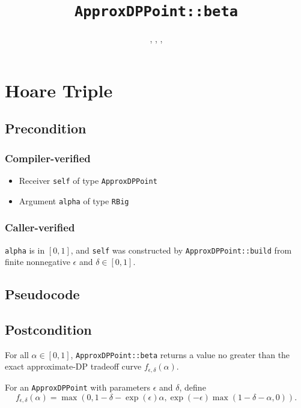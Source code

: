 \documentclass{article}
\title{\texttt{ApproxDPPoint::beta}}
\author{\AishwaryaRamasethuAuthor, \YuJuKuAuthor, \JordanAwanAuthor, \MichaelShoemateAuthor}
\begin{document}
\maketitle

\contrib

\section{Hoare Triple}

\subsection*{Precondition}
\subsubsection*{Compiler-verified}
\begin{itemize}
    \item Receiver \texttt{self} of type \texttt{ApproxDPPoint}
    \item Argument \texttt{alpha} of type \texttt{RBig}
\end{itemize}

\subsubsection*{Caller-verified}
\texttt{alpha} is in $[0,1]$, and \texttt{self} was constructed by
\texttt{ApproxDPPoint::build} from finite nonnegative $\epsilon$ and
$\delta \in [0,1]$.

\subsection*{Pseudocode}



\subsection*{Postcondition}

\begin{theorem}
    For all $\alpha \in [0, 1]$, \texttt{ApproxDPPoint::beta} returns a value
    no greater than the exact approximate-DP tradeoff curve
    $f_{\epsilon,\delta}(\alpha)$.
\end{theorem}

\begin{definition}
    \label{def-approxdp-point-beta}
    For an \texttt{ApproxDPPoint} with parameters $\epsilon$ and $\delta$, define
    \begin{equation}
        f_{\epsilon,\delta}(\alpha) = \max(0, 1 - \delta - \exp(\epsilon) \alpha,
        \exp(-\epsilon) \max(1 - \delta - \alpha, 0)).
    \end{equation}
\end{definition}
\end{document}
